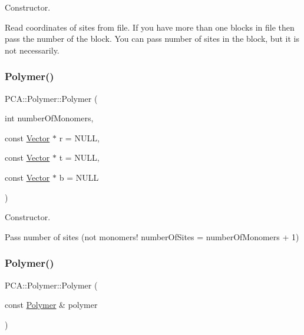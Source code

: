 Constructor. 

Read coordinates of sites from file. If you have more than one blocks in file then pass the number of the block. You can pass number of sites in the block, but it is not necessarily. \hypertarget{class_p_c_a_1_1_polymer_ac2645c33eba98a8ec1670d69b92060c8}{}\label{class_p_c_a_1_1_polymer_ac2645c33eba98a8ec1670d69b92060c8} 
\subsubsection{\texorpdfstring{Polymer()}{Polymer()}\hspace{0.1cm}{\footnotesize\ttfamily [2/3]}}
{\footnotesize\ttfamily P\+C\+A\+::\+Polymer\+::\+Polymer (\begin{DoxyParamCaption}\item[{int}]{number\+Of\+Monomers,  }\item[{const \hyperlink{class_p_c_a_1_1_vector}{Vector} $\ast$}]{r = {\ttfamily NULL},  }\item[{const \hyperlink{class_p_c_a_1_1_vector}{Vector} $\ast$}]{t = {\ttfamily NULL},  }\item[{const \hyperlink{class_p_c_a_1_1_vector}{Vector} $\ast$}]{b = {\ttfamily NULL} }\end{DoxyParamCaption})}



Constructor. 

Pass number of sites (not monomers! number\+Of\+Sites = number\+Of\+Monomers + 1) \hypertarget{class_p_c_a_1_1_polymer_a1ce99540db06e9e48392423ba516cd2f}{}\label{class_p_c_a_1_1_polymer_a1ce99540db06e9e48392423ba516cd2f} 
\subsubsection{\texorpdfstring{Polymer()}{Polymer()}\hspace{0.1cm}{\footnotesize\ttfamily [3/3]}}
{\footnotesize\ttfamily P\+C\+A\+::\+Polymer\+::\+Polymer (\begin{DoxyParamCaption}\item[{const \hyperlink{class_p_c_a_1_1_polymer}{Polymer} \&}]{polymer }\end{DoxyParamCaption})}



